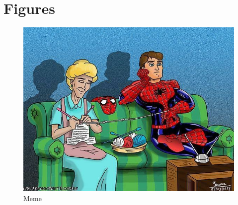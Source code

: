 \documentclass{article}
\begin{document}
    \section{Figures}
    \begin{figure}[t!]
        \includegraphics[width=\linewidth]{pic.png}
        \caption{Meme}
        \label{fig:meme}
    \end{figure}
\end{document}
